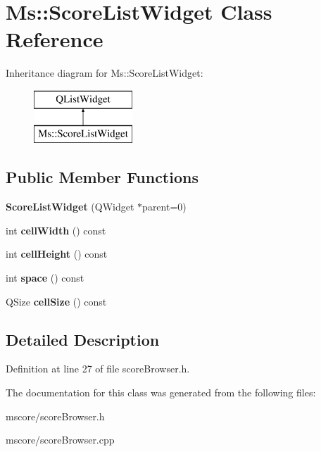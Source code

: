 \hypertarget{class_ms_1_1_score_list_widget}{}\section{Ms\+:\+:Score\+List\+Widget Class Reference}
\label{class_ms_1_1_score_list_widget}
Inheritance diagram for Ms\+:\+:Score\+List\+Widget\+:\begin{figure}[H]
\begin{center}
\leavevmode
\includegraphics[height=2.000000cm]{class_ms_1_1_score_list_widget}
\end{center}
\end{figure}
\subsection*{Public Member Functions}
\begin{DoxyCompactItemize}
\item 
\mbox{\label{class_ms_1_1_score_list_widget_aed18bac3d006dcd103359876970caa50}} 
{\bfseries Score\+List\+Widget} (Q\+Widget $\ast$parent=0)
\item 
\mbox{\label{class_ms_1_1_score_list_widget_a339182a9ed85417585b29c2faeec1a15}} 
int {\bfseries cell\+Width} () const
\item 
\mbox{\label{class_ms_1_1_score_list_widget_a0f5127629a10390b9961d8e82acd034c}} 
int {\bfseries cell\+Height} () const
\item 
\mbox{\label{class_ms_1_1_score_list_widget_afab3a8b5e05bc6628cbc49f0e5cfe88b}} 
int {\bfseries space} () const
\item 
\mbox{\label{class_ms_1_1_score_list_widget_a6f3c602675a00fbdc6aa81bba6ea53ed}} 
Q\+Size {\bfseries cell\+Size} () const
\end{DoxyCompactItemize}


\subsection{Detailed Description}


Definition at line 27 of file score\+Browser.\+h.



The documentation for this class was generated from the following files\+:\begin{DoxyCompactItemize}
\item 
mscore/score\+Browser.\+h\item 
mscore/score\+Browser.\+cpp\end{DoxyCompactItemize}
